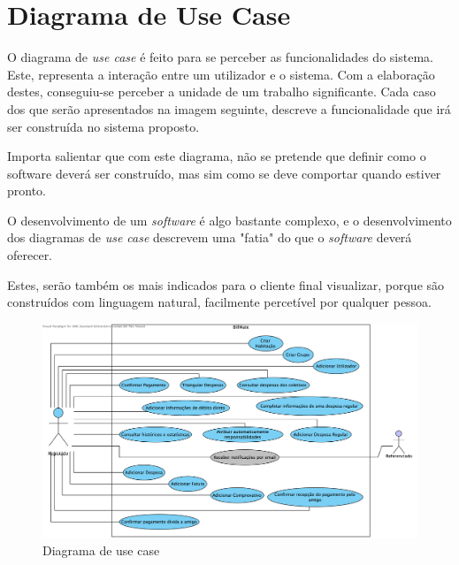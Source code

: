 \section{Diagrama de Use Case}

O diagrama de \textit{use case} é feito para se perceber as funcionalidades do sistema. Este, representa a interação entre um utilizador e o sistema. Com a elaboração destes, conseguiu-se perceber a unidade de um trabalho significante. Cada caso dos que serão apresentados na imagem seguinte, descreve a funcionalidade que irá ser construída no sistema proposto.

Importa salientar que com este diagrama, não se pretende que definir como o software deverá ser construído, mas sim como se deve comportar quando estiver pronto.

O desenvolvimento de um \textit{software} é algo bastante complexo, e o desenvolvimento dos diagramas de \textit{use case} descrevem uma "fatia" do que o \textit{software} deverá oferecer.

Estes, serão também os mais indicados para o cliente final visualizar, porque são construídos com linguagem natural, facilmente percetível por qualquer pessoa. \\


\begin{figure}[ht]
\centerline{\includegraphics[width=1\textwidth]{images/modeling/useCase}}
\caption{Diagrama de use case}
\end{figure}
